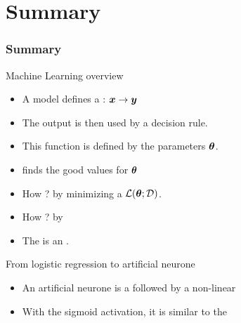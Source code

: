 \documentclass[10pt]{beamer}
\begin{document}
\section{Summary}
\begin{frame}
  \frametitle{Summary}
  \begin{block}{Machine Learning overview}
    \begin{itemize}
    \item A model defines a :
      $\boldsymbol{x} \rightarrow \boldsymbol{y}$
    \item The output is then used by a decision rule.
    \item This function is defined by the parameters $\boldsymbol{\theta}$.
    \item {} finds the good values for
      $\boldsymbol{\theta}$
    \item How ? by minimizing a  $\mathcal{L}(\boldsymbol{\theta};\mathcal{D})$.
    \item How ? by 
    \item The  is an
      .
    \end{itemize}
  \end{block}
  \begin{block}{From logistic regression to artificial neurone}
    \begin{itemize}
    \item An artificial neurone is a  followed by a
      non-linear 
    \item With the sigmoid activation, it is similar to the
    \end{itemize}
  \end{block}
\end{frame}


{\footnotesize }
\end{document}
